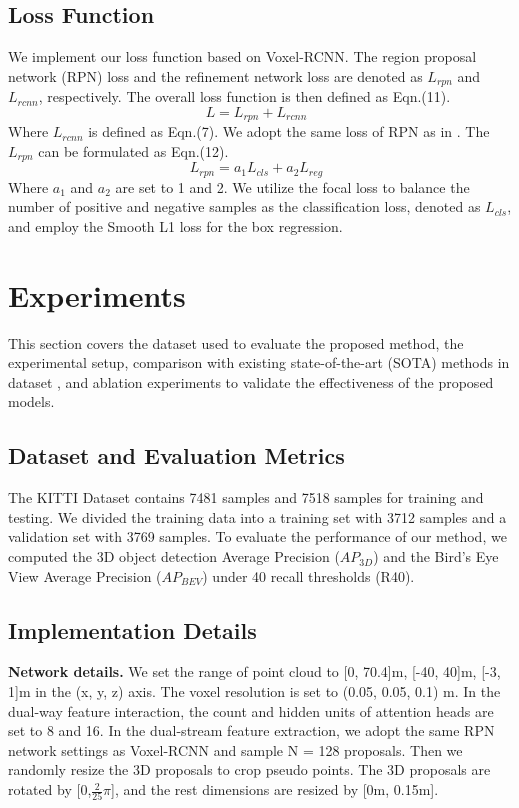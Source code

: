 \begin{sloppypar}
\subsection{Loss Function}
We implement our loss function based on Voxel-RCNN\cite{21}. The region proposal network (RPN) loss and the refinement network loss are denoted as $L_{rpn}$  and $L_{rcnn}$, respectively. The overall loss function is then defined as Eqn.(11).
\begin{equation}
L = L_{rpn} + L_{rcnn} \enspace
\end{equation}
Where $L_{rcnn}$ is defined as Eqn.(7). We adopt the same loss of RPN as in \cite{20,21}. The $L_{rpn}$ can be formulated as Eqn.(12).
\begin{equation}
L_{rpn} = a_1L_{cls} + a_2L_{reg} \enspace
\end{equation}
Where $a_1$ and $a_2$ are set to 1 and 2. We utilize the focal loss to balance the number of positive and negative samples as the classification loss, denoted as $L_{cls}$, and employ the Smooth L1 loss for the box regression.

\section{Experiments}
This section covers the dataset used to evaluate the proposed method, the experimental setup, comparison with existing state-of-the-art (SOTA) methods in dataset , and ablation experiments to validate the effectiveness of the proposed models.
\subsection{Dataset and Evaluation Metrics}
The KITTI Dataset contains 7481 samples and 7518 samples for training and testing. We divided the training data into a training set with 3712 samples and a validation set with 3769 samples. To evaluate the performance of our method, we computed the 3D object detection Average Precision ($AP_{3D}$) and the Bird's Eye View Average Precision ($AP_{BEV}$) under 40 recall thresholds (R40).

\subsection{Implementation Details}
{\bfseries Network details.} We set the range of point cloud to [0, 70.4]m, [-40, 40]m, [-3, 1]m in the (x, y, z) axis. The voxel resolution is set to (0.05, 0.05, 0.1) m. In the dual-way feature interaction, the count and hidden units of attention heads are set to 8 and 16. In the dual-stream feature extraction, we adopt the same RPN network settings as Voxel-RCNN\cite{21} and sample N = 128 proposals. Then we randomly resize the 3D proposals to crop pseudo points. The 3D proposals are rotated by [0,$\frac{2}{25}\pi$], and the rest dimensions are resized by [0m, 0.15m]. 


\end{sloppypar}
